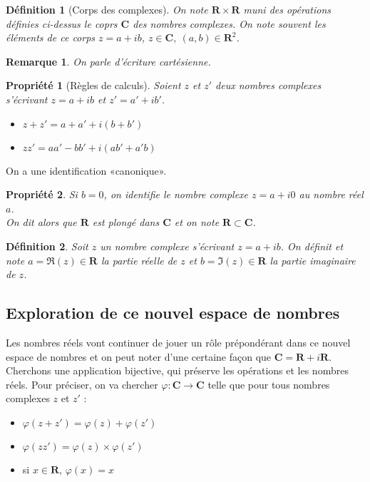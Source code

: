 \documentclass[11pt,a4paper,french]{article}
\newcommand{\R}{\mathbf{R}}
\newcommand{\C}{\mathbf{C}}
\theoremstyle{break}
\newtheorem{definition}{Définition}
\newtheorem{propriete}{Propriété}
\theoremstyle{plain}
\theoremstyle{nonumberplain}
\newtheorem{remarque}{Remarque}
\theoremstyle{nonumberbreak}
\begin{document}
\begin{definition}[Corps des complexes]
  On note $\R\times\R$ muni des opérations définies ci-dessus le coprs
  $\C$ des nombres complexes. On note souvent les éléments de ce corps
  $z = a + ib$, $z\in \C,\ (a,b)\in \R^2$.
\end{definition}

\begin{remarque}
  On parle d'écriture cartésienne.
\end{remarque}

\begin{propriete}[Règles de calculs]
  Soient $z$ et $z'$ deux nombres complexes s'écrivant $z = a + i b$ et
  $z' = a' + i b'$.
  \begin{itemize}
    \item $z + z' = a + a' + i(b + b')$
    \item $zz' = aa' - bb' + i(ab' + a'b)$
  \end{itemize}
\end{propriete}

On a une identification «canonique».

\begin{propriete}
  Si $b = 0$, on identifie le nombre complexe $z = a +i0$ au nombre réel
  $a$.\\ On dit alors que $\R$ est plongé dans $\C$ et on note $\R
  \subset \C$.
\end{propriete}

\begin{definition}
  Soit $z$ un nombre complexe s'écrivant $z = a +ib$. On définit et note
  $a = \Re(z)\in\R $ la partie réelle de $z$ et $b = \Im(z) \in \R$ la
  partie imaginaire de $z$.
\end{definition}

\subsection{Exploration de ce nouvel espace de nombres}

Les nombres réels vont continuer de jouer un rôle prépondérant dans ce
nouvel espace de nombres et on peut noter d'une certaine façon que $\C
= \R + i\R$. Cherchons une application bijective, qui préserve les
opérations et les nombres réels. Pour préciser, on va chercher $\varphi
\colon \C \to \C$ telle que pour tous nombres complexes $z$ et $z'$ :
\begin{itemize}
  \item $\varphi(z+z') = \varphi(z) + \varphi(z')$
  \item $\varphi(zz') = \varphi(z) \times \varphi(z')$
  \item si $x\in \R$, $\varphi(x) = x$
\end{itemize}
\end{document}
